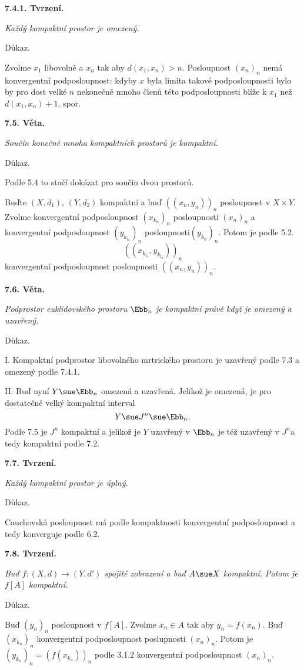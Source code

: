 \documentclass[12pt]{article}
\begin{document}
{ \medskip
 
 {\bf 7.4.1. Tvrzení.} {\em Každý kompaktní prostor je omezený.

Důkaz.} Zvolme $x_1$ libovoln\v e a $x_n$ 
 tak aby
 $d(x_1,x_n)>n$. Posloupnost $(x_n)_n$ nemá konvergentní podposloupnost:
 kdyby $x$ byla limita takové podposloupnosti bylo by pro dost velk\'e $n$ nekonečně mnoho členů této podposloupnosti blíže k $x_1$ než $d(x_1,x_n)+1$, spor.\sq
 
 \bigskip
 
 {\bf 7.5. Věta.} {\em Součin konečně mnoha kompaktních prostorů je kompaktní.
 
 Důkaz.} Podle 5.4 to stačí dokázat pro součin dvou prostorů.
 
 Buďte $(X,d_1)$, $(Y, d_2)$ kompaktní a buď $((x_n,y_n))_n$ posloupnost v $X\times Y$. Zvolme konvergentní podposloupnost $(x_{k_n})_n$
 posloupnosti $(x_n)_n$ a konvergentní podposloupnost $(y_{k_{l_n}})_n$
posloupnosti$(y_{k_n})_n$. Potom je podle 5.2.
 $$
 ((x_{k_{l_n}},y_{k_{l_n}}))_n
 $$
konvergentní podposloupnost posloupnosti $((x_n,y_n))_n$. \sq
 
 \bigskip
 
 {\bf 7.6. Věta.} {\em Podprostor euklidovského prostoru $\Ebb_n$ je kompaktní právě když je omezený a uzavřený.
 
 Důkaz.} I. Kompaktní podprostor libovolného mrtrického prostoru je uzavřený podle 7.3 a omezený podle 7.4.1.
 
 
II. Buď nyní $Y\sue \Ebb_n$ omezená a uzavřená. Jelikož je omezená, je pro dostatečně velký kompaktní interval
$$
Y\sue J^n\sue\Ebb_n.
$$
Podle 7.5 je $J^n$ kompaktní a jelikož je $Y$ uzavřený v $\Ebb_n$ je též uzavřený v $J^n$a tedy kompaktní 
 podle 7.2. \sq 
 
 \bigskip
 
 {\bf 7.7. Tvrzení.} {\em Každý kompaktní prostor je úplný.
 
 Důkaz.} Cauchovská posloupnost má podle kompaktnosti konvergentní podposloupnost a tedy konverguje podle 6.2.\sq
 
 \bigskip
 
 {\bf 7.8. Tvrzení.} {\em  Buď  $f:(X,d)\to (Y,d')$ spojité zobrazení a buď $A\sue X$ kompaktní. Potom je $f[A]$ kompaktní.
 
 Důkaz.} Buď $(y_n)_n$  posloupnost v $f[A]$. Zvolme $x_n\in A$ tak aby $y_n=f(x_n)$. Buď $(x_{k_n})_n$ konvergentní podposloupnost
poslupnosti $(x_n)_n$. Potom je $(y_{k_n})_n=(f(x_{k_n}))_n$ podle 3.1.2
konvergentní podposloupnost $(x_{n})_n$. \sq
 
}
\end{document}
